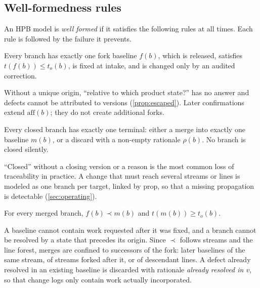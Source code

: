 \subsection{Well-formedness rules}
\label{sec:model-rules}

An HPB model is \emph{well formed} if it satisfies the following rules at
all times. Each rule is followed by the failure it prevents.

\begin{hpbrule}
  \label{rule:origin}
  Every branch has exactly one fork baseline $f(b)$, which is released,
  satisfies $t(f(b)) \le t_o(b)$, is fixed at intake, and is changed only
  by an audited correction.
\end{hpbrule}
\noindent Without a unique origin, ``relative to which product state?''
has no answer and defects cannot be attributed to versions
(\cref{prop:escaped}). Later confirmations extend $\mathrm{aff}(b)$; they
do not create additional forks.

\begin{hpbrule}
  \label{rule:closure}
  Every closed branch has exactly one terminal: either a merge into exactly
  one baseline $m(b)$, or a discard with a non-empty rationale $\rho(b)$.
  No branch is closed silently.
\end{hpbrule}
\noindent ``Closed'' without a closing version or a reason is the most
common loss of traceability in practice. A change that must reach several
streams or lines is modeled as one branch per target, linked by
$\mathrm{prop}$, so that a missing propagation is detectable
(\cref{sec:operating}).

\begin{hpbrule}
  \label{rule:time}
  For every merged branch, $f(b) \prec m(b)$ and $t(m(b)) \ge t_o(b)$.
\end{hpbrule}
\noindent A baseline cannot contain work requested after it was fixed, and
a branch cannot be resolved by a state that precedes its origin. Since
$\prec$ follows streams and the line forest, merges are confined to
successors of the fork: later baselines of the same stream, of streams
forked after it, or of descendant lines. A defect already resolved in an
existing baseline is discarded with rationale \emph{already resolved in
$v$}, so that change logs only contain work actually incorporated.

